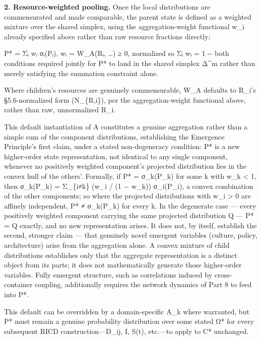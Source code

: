 \documentclass[
]{article}
\begin{document}
\textbf{2. Resource-weighted pooling.} Once the local distributions are
commensurated and made comparable, the parent state is defined as a
weighted mixture over the shared simplex, using the aggregation-weight
functional w\_i already specified above rather than raw resource
fractions directly:

P* = Σᵢ wᵢ σᵢ(Pᵢ), wᵢ = W\_A(Rᵢ, \ldots) ≥ 0, normalized so Σᵢ wᵢ = 1
-\/- both conditions required jointly for P* to land in the shared
simplex Δ\^{}m rather than merely satisfying the summation constraint
alone.

Where children's resources are genuinely commensurable, W\_A defaults to
R\_i's §5.6-normalized form (N\_\{R,i\}), per the aggregation-weight
functional above, rather than raw, unnormalized R\_i.

This default instantiation of A constitutes a genuine aggregation rather
than a simple sum of the component distributions, establishing the
Emergence Principle's first claim, under a stated non-degeneracy
condition: P* is a new higher-order state representation, not identical
to any single component, whenever no positively weighted component's
projected distribution lies in the convex hull of the others'. Formally,
if P* = σ\_k(P\_k) for some k with w\_k \textless{} 1, then σ\_k(P\_k) =
Σ\_\{i≠k\} (w\_i / (1 − w\_k)) σ\_i(P\_i), a convex combination of the
other components; so where the projected distributions with w\_i
\textgreater{} 0 are affinely independent, P* ≠ σ\_k(P\_k) for every k.
In the degenerate case --- every positively weighted component carrying
the same projected distribution Q --- P* = Q exactly, and no new
representation arises. It does not, by itself, establish the second,
stronger claim --- that genuinely novel emergent variables (culture,
policy, architecture) arise from the aggregation alone. A convex mixture
of child distributions establishes only that the aggregate
representation is a distinct object from its parts; it does not
mathematically generate those higher-order variables. Fully emergent
structure, such as correlations induced by cross-container coupling,
additionally requires the network dynamics of Part 8 to feed into P*.

This default can be overridden by a domain-specific A\_k where
warranted, but P* must remain a genuine probability distribution over
some stated Ω* for every subsequent RICD construction---D\_ij, I, S(t),
etc.---to apply to C* unchanged.
\end{document}

